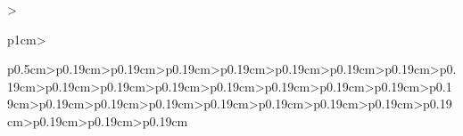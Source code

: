 \documentclass[
  12pt,
  oneside]{book}
\begin{document}
\begin{landscape}

\begingroup\fontsize{6}{8}\selectfont

\begin{longtable*}[t]{>{\raggedright\arraybackslash}p{1cm}>{\raggedright\arraybackslash}p{0.5cm}>{\raggedleft\arraybackslash}p{0.19cm}>{\raggedleft\arraybackslash}p{0.19cm}>{\raggedleft\arraybackslash}p{0.19cm}>{\raggedleft\arraybackslash}p{0.19cm}>{\raggedleft\arraybackslash}p{0.19cm}>{\raggedleft\arraybackslash}p{0.19cm}>{\raggedleft\arraybackslash}p{0.19cm}>{\raggedleft\arraybackslash}p{0.19cm}>{\raggedleft\arraybackslash}p{0.19cm}>{\raggedleft\arraybackslash}p{0.19cm}>{\raggedleft\arraybackslash}p{0.19cm}>{\raggedleft\arraybackslash}p{0.19cm}>{\raggedleft\arraybackslash}p{0.19cm}>{\raggedleft\arraybackslash}p{0.19cm}>{\raggedleft\arraybackslash}p{0.19cm}>{\raggedleft\arraybackslash}p{0.19cm}>{\raggedleft\arraybackslash}p{0.19cm}>{\raggedleft\arraybackslash}p{0.19cm}>{\raggedleft\arraybackslash}p{0.19cm}>{\raggedleft\arraybackslash}p{0.19cm}>{\raggedleft\arraybackslash}p{0.19cm}>{\raggedleft\arraybackslash}p{0.19cm}>{\raggedleft\arraybackslash}p{0.19cm}>{\raggedleft\arraybackslash}p{0.19cm}>{\raggedleft\arraybackslash}p{0.19cm}>{\raggedleft\arraybackslash}p{0.19cm}>{\raggedleft\arraybackslash}p{0.19cm}}
\toprule

\end{longtable*}
\end{landscape}
\end{document}
